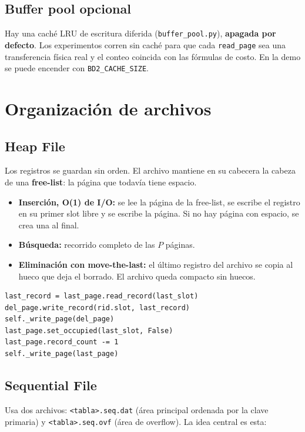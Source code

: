 \documentclass[11pt,a4paper]{article}
\newcommand{\code}[1]{\texttt{#1}}
\begin{document}
\subsection{Buffer pool opcional}

Hay una caché LRU de escritura diferida (\code{buffer\_pool.py}), \textbf{apagada por
defecto}. Los experimentos corren sin caché para que cada \code{read\_page} sea una
transferencia física real y el conteo coincida con las fórmulas de costo. En la demo
se puede encender con \code{BD2\_CACHE\_SIZE}.

\section{Organización de archivos}

\subsection{Heap File}

Los registros se guardan sin orden. El archivo mantiene en su cabecera la cabeza de
una \textbf{free-list}: la página que todavía tiene espacio.

\begin{itemize}
  \item \textbf{Inserción, O(1) de I/O:} se lee la página de la free-list, se escribe
        el registro en su primer slot libre y se escribe la página. Si no hay página
        con espacio, se crea una al final.
  \item \textbf{Búsqueda:} recorrido completo de las $P$ páginas.
  \item \textbf{Eliminación con move-the-last:} el último registro del archivo se
        copia al hueco que deja el borrado. El archivo queda compacto sin huecos.
\end{itemize}

\begin{lstlisting}
last_record = last_page.read_record(last_slot)
del_page.write_record(rid.slot, last_record)
self._write_page(del_page)
last_page.set_occupied(last_slot, False)
last_page.record_count -= 1
self._write_page(last_page)
\end{lstlisting}

\subsection{Sequential File}

Usa dos archivos: \code{<tabla>.seq.dat} (área principal ordenada por la clave
primaria) y \code{<tabla>.seq.ovf} (área de overflow). La idea central es esta:
\end{document}
